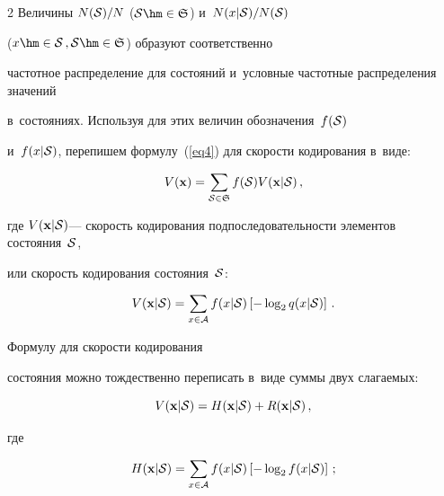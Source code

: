 \begin{multicols}{2}
Величины $N({\cal S})/N$  (${\cal S}\hm\in{\frak S} $) и~$N(x|{\cal S})/N({\cal S})$  

($x\hm\in{\cal S}\,,{\cal S}\hm\in{\frak S}$) образуют соответственно 

частотное распределение для состояний и~условные частотные распределения значений 

в~со\-сто\-яни\-ях. Используя для этих величин обозначения~$f(\cal S)$ 

и~$f(x|\cal S)$, перепишем формулу~(\ref{eq4}) для скорости кодирования в~виде:

\begin{equation}

\label{eq5}

V(\mathbf{x}) = \sum\limits_{{\cal S}\in{\frak S}} f({\cal S}) V(\mathbf{x}|{\cal S})\,,

\end{equation}

где $V(\mathbf{x}|{\cal S})$--- скорость кодирования подпоследовательности элементов состояния~${\cal S}$, 

или скорость кодирования состояния~${\cal S}$:

\begin{equation}

\label{eq6}

V(\mathbf{x}|{\cal S}) = \sum\limits_{x\in{\cal A}} 

f(x|{\cal S}) \left[-\log_{2}q(x|{\cal S})\right]\,.

\end{equation}

 Формулу для скорости кодирования 

состояния можно тождественно переписать в~виде суммы двух слагаемых:

\begin{equation}

\label{eq7}

V(\mathbf{x}|{\cal S}) = H(\mathbf{x}|{\cal S})+R(\mathbf{x}|{\cal S})\,,

\end{equation}

где

\begin{align}

\label{eq8}

H(\mathbf{x}|{\cal S}) &= \sum\limits_{x\in{\cal A}} f(x|{\cal S}) 

\left[-\log_{2}f(x|{\cal S})\right]\,;

\\


\end{align}
\end{multicols}
